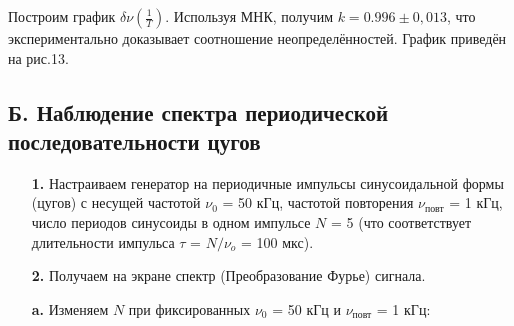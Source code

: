 \documentclass[a4paper,12pt]{article}
\begin{document}
\begin{enumerate}
Построим график $\delta\nu\left(\frac{1}{T}\right)$. Используя МНК, получим $k=0.996\pm0,013$, что экспериментально доказывает соотношение неопределённостей. График приведён на рис.13.
\end{enumerate}

\newpage

\subsection*{Б. Наблюдение спектра периодической последовательности цугов}

\begin{enumerate}
\item [\textbf{1.}] Настраиваем генератор на периодичные импульсы синусоидальной формы (цугов) с несущей частотой $\nu_0$ = 50 кГц, частотой повторения $\nu_\text{повт}$ = 1 кГц, число периодов синусоиды в одном импульсе $N$ = 5 (что соответствует длительности импульса $\tau$ = $N/\nu_o$ = 100 мкс).

\item [\textbf{2.}] Получаем на экране спектр (Преобразование Фурье) сигнала.

\textbf{a.} Изменяем $N$ при фиксированных $\nu_0$ = 50 кГц и $\nu_\text{повт}$ = 1 кГц:


\end{enumerate}
\end{document}
